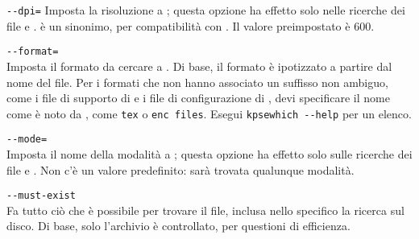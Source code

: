 \documentclass{article}
\begin{document}
\begin{ttdescription}
\item[\texttt{-{}-dpi=\var{num}}]\mbox{}
  Imposta la risoluzione a ; questa opzione ha effetto solo
  nelle ricerche dei file  e .  è un sinonimo,
  per compatibilità con . Il valore preimpostato è 600.

\item[\texttt{-{}-format=\var{nome}}]\mbox{}\\
  Imposta il formato da cercare a . Di base, il formato è
  ipotizzato a partire dal nome del file. Per i formati che non hanno
  associato un suffisso non ambiguo, come i file di supporto di \MP{} e i
  file di configurazione di , devi specificare il nome come
  è noto da \KPS{}, come \texttt{tex} o \texttt{enc files}. Esegui
  \texttt{kpsewhich -{}-help} per un elenco.

\item[\texttt{-{}-mode=\var{stringa}}]\mbox{}\\
  Imposta il nome della modalità a ; questa opzione ha
  effetto solo sulle ricerche dei file  e . Non c'è un
  valore predefinito: sarà trovata qualunque modalità.

\item[\texttt{-{}-must-exist}]\mbox{}\\
  Fa tutto ciò che è possibile per trovare il file, inclusa nello
  specifico la ricerca sul disco. Di base, solo l'archivio  è
  controllato, per questioni di efficienza.


\end{ttdescription}
\end{document}
